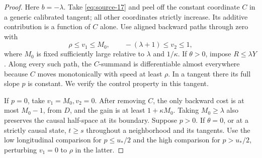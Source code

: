 \begin{proof}
Here \(b=-\lambda\). Take \eqref{eq:source-17} and peel off
the constant coordinate \(C\) in a generic calibrated tangent;
all other coordinates strictly increase. Its additive contribution
is a function of \(C\) alone. Use aligned backward paths through
zero with
\[
\rho\le v_1\le M_0,\qquad -(\lambda+1)\le v_2\le1,
\]
where \(M_0\) is fixed sufficiently large relative to
\(\lambda\) and \(1/\kappa\). If \(\theta>0\), impose
\(R\le\lambda Y\). Along every such path, the \(C\)-summand
is differentiable almost everywhere because \(C\) moves
monotonically with speed at least \(\rho\). In a tangent
there its full slope \(p\) is constant. We verify the control
property in this tangent.

If \(p=0\), take \(v_1=M_0,v_2=0\).
After removing \(C\), the only backward cost is at most
\(M_0-1\), from \(D\), and the gain is at least
\(1+\kappa M_0\). Taking \(M_0\ge\lambda\) also
preserves the causal half-space at its boundary.
Suppose \(p>0\). If \(\theta=0\), or at a strictly
causal state, \(t\ge s\) throughout a neighborhood and its
tangents. Use the low longitudinal comparison for \(p\le u_*/2\)
and the high comparison for \(p>u_*/2\), perturbing
\(v_1=0\) to \(\rho\) in the latter.


\end{proof}
